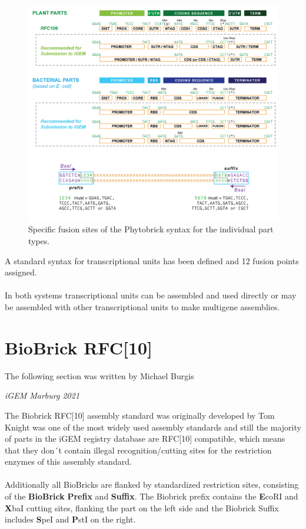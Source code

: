 \begin{figure}[!htbp]
    \centering
    \includegraphics[width=\textwidth]{images/chap4/chap4_phy_01.png}
    \caption{Specific fusion sites of the Phytobrick syntax for the individual part types.}
    \label{fig:ch4phy01}
\end{figure}
\FloatBarrier

\noindent
A standard syntax for transcriptional units has been defined and 12 fusion points assigned. \\ \\
In both systems transcriptional units can be assembled and used directly or may be assembled with other transcriptional units to make multigene assemblies. 


\section{BioBrick RFC[10]}
\epigraph{The following section was written by Michael Burgis}{\textit{iGEM Marburg 2021}}
The Biobrick RFC[10] assembly standard was originally developed by Tom Knight was one of the most widely used assembly standards and still the majority of parts in the iGEM registry database are RFC[10] compatible, which means that they don´t contain illegal recognition/cutting sites for the restriction enzymes of this assembly standard.\\ \\
Additionally all BioBricks are flanked by standardized restriction sites, consisting of the \textbf{BioBrick} \textbf{Prefix} and \textbf{Suffix}. The Biobrick prefix contains the \textbf{E}coRI and \textbf{X}baI cutting sites, flanking the part on the left side and the Biobrick Suffix  includes \textbf{S}peI and \textbf{P}stI on the right.

